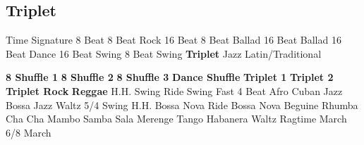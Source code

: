 \subsection{Triplet}
Time Signature
8 Beat
8 Beat Rock
16 Beat
8 Beat Ballad
16 Beat Ballad
16 Beat Dance
16 Beat Swing
8 Beat Swing
\textbf{Triplet}
Jazz
Latin/Traditional





























\textbf{8 Shuffle 1}
\textbf{8 Shuffle 2}
\textbf{8 Shuffle 3}
\textbf{Dance Shuffle}
\textbf{Triplet 1}
\textbf{Triplet 2}
\textbf{Triplet Rock}
\textbf{Reggae}
H.H. Swing
Ride Swing
Fast 4 Beat
Afro Cuban
Jazz Bossa
Jazz Waltz
5/4 Swing
H.H. Bossa Nova
Ride Bossa Nova
Beguine
Rhumba
Cha Cha
Mambo
Samba
Sala
Merenge
Tango
Habanera
Waltz
Ragtime
March
6/8 March
